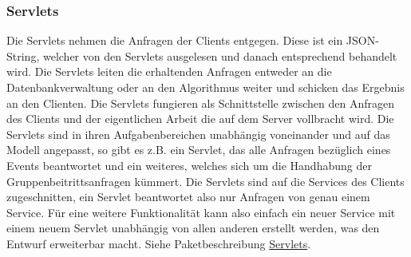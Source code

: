 \begin {center}
\end {center}

	\subsubsection{Servlets}

	Die Servlets nehmen die Anfragen der Clients entgegen. Diese ist ein JSON-String, welcher von den Servlets ausgelesen und danach entsprechend behandelt wird. Die Servlets leiten die erhaltenden Anfragen entweder an die Datenbankverwaltung oder an den Algorithmus weiter und schicken das Ergebnis an den Clienten.
Die Servlets fungieren als Schnittstelle zwischen den Anfragen des Clients und der eigentlichen Arbeit die auf dem Server vollbracht wird. 
Die Servlets sind in ihren Aufgabenbereichen unabhängig voneinander und auf das Modell angepasst, so gibt es z.B. ein Servlet, das alle Anfragen bezüglich eines Events beantwortet und ein weiteres, welches sich um die Handhabung der Gruppenbeitrittsanfragen kümmert.
Die Servlets sind auf die Services des Clients zugeschnitten, ein Servlet beantwortet also nur Anfragen von genau einem Service.
Für eine weitere Funktionalität kann also einfach ein neuer Service mit einem neuem Servlet unabhängig von allen anderen erstellt werden, was den Entwurf erweiterbar macht.   
\newline
Siehe Paketbeschreibung \hyperlink{servlet}{Servlets}.

